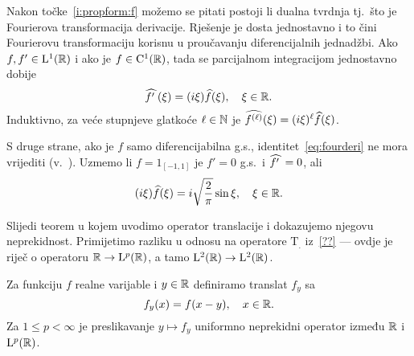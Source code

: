 \documentclass[main.tex]{subfiles}
\begin{document}
\begin{komentar}
	\newcommand{\fourderi}[1]{\wh{{#1}^{\prime\phantom{.}}  }}
	Nakon točke~\ref{i:propform:f} možemo se pitati postoji li dualna tvrdnja
	tj.\ što je Fourierova transformacija derivacije. Rješenje je dosta
	jednostavno i to čini Fourierovu transformaciju korisnu u proučavanju
	diferencijalnih jednadžbi. Ako \( f,f' \in \mathrm{L}^1(\mathbb{R}) \) i ako je \( f \in \mathrm C^1(\mathbb{R} )\),
	tada se parcijalnom integracijom jednostavno dobije
	\begin{equation}\label{eq:fourderi}
		\fourderi f (\xi) = (i\xi)\wh f(\xi), \quad \xi \in \R.
	\end{equation}
	Induktivno, za veće stupnjeve glatkoće \( \ell \in \mathbb{N} \)
	je \( \widehat{f^{(\ell)}}(\xi) = (i\xi)^\ell \widehat{f}(\xi)  \).

	S druge strane, ako je \( f \) samo diferencijabilna g.s., identitet~\eqref{eq:fourderi}
	ne mora vrijediti (v.~\cite[exercise~9.6]{rudin}). Uzmemo li \( f=1_{[-1,1]} \)
	je \( f'=0 \) g.s.\ i \( \fourderi f = 0 \), ali
	\begin{equation}
		(i\xi)\widehat{f}(\xi) = i\sqrt{\frac 2\pi} \sin \xi, \quad \xi \in \mathbb{R}.
	\end{equation}
\end{komentar}

Slijedi teorem u kojem uvodimo
operator translacije i dokazujemo njegovu neprekidnost.
Primijetimo razliku u odnosu na operatore \( \mathrm T_. \)
iz~\ref{??} --- ovdje je riječ o operatoru \( \mathbb{R} \to \mathrm{L}^p(\mathbb{R}) \),
a tamo \( \mathrm{L}^2(\mathbb{R}) \to \mathrm{L}^2(\mathbb{R}) \).

\begin{teorem}\label{tm:trans}
	Za funkciju \( f \) realne varijable i \( y \in \mathbb{R} \) definiramo
	translat \( f_y \) sa
	\begin{equation}
		f_y(x) = f(x-y), \quad x \in \mathbb{R}.
	\end{equation}
	Za  \( 1 \le p < \infty \) je preslikavanje \( y \mapsto f_y \)
	uniformno neprekidni operator između \( \mathbb{R} \) i \( \mathrm{L}^p(\mathbb{R}) \).
\end{teorem}
\end{document}

